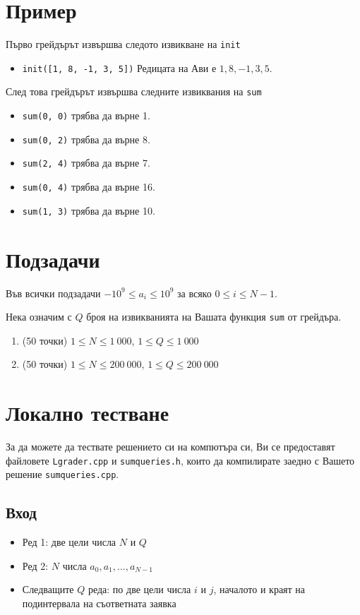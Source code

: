 \documentclass[a4paper,11pt]{article}
\newcommand{\code}[1]{\texttt{#1}}
\newcommand{\noskip}{\vspace{-\parskip}}
\begin{document}
\section*{Пример}
Първо грейдърът извършва следото извикване на \code{init}
\noskip
\begin{itemize}
    \item \code{init([1, 8, -1, 3, 5])} Редицата на Ави е $1, 8, -1, 3, 5$.
\end{itemize}
След това грейдърът извършва следните извиквания на \code{sum}
\noskip
\begin{itemize}
    \item \code{sum(0, 0)} трябва да върне 1.
    \item \code{sum(0, 2)} трябва да върне 8.
    \item \code{sum(2, 4)} трябва да върне 7.
    \item \code{sum(0, 4)} трябва да върне 16.
    \item \code{sum(1, 3)} трябва да върне 10.
\end{itemize}

\section*{Подзадачи}
Във всички подзадачи $-10^9 \leq a_i \leq 10^9$ за всяко $0 \leq i \leq N - 1$.

Нека означим с $Q$ броя на извикванията на Вашата функция \code{sum} от
грейдъра.
\noskip
\begin{enumerate}
    \item (50 точки) $1 \leq N \leq 1\ 000$, $1 \leq Q \leq 1\ 000$
    \item (50 точки) $1 \leq N \leq 200\ 000$, $1 \leq Q \leq 200\ 000$
\end{enumerate}
\section*{Локално тестване}
За да можете да тествате решението си на компютъра си, Ви се предоставят
файловете \code{Lgrader.cpp} и \code{sumqueries.h}, които да компилирате
заедно с Вашето решение \code{sumqueries.cpp}.

\noskip
\subsection*{Вход}
\noskip
\begin{itemize}
    \item Ред 1: две цели числа $N$ и $Q$
    \item Ред 2: $N$ числа $a_0, a_1, ..., a_{N-1}$
    \item Следващите $Q$ реда: по две цели числа $i$ и $j$, началото и краят на
        подинтервала на съответната заявка
\end{itemize}
\noskip
\end{document}
